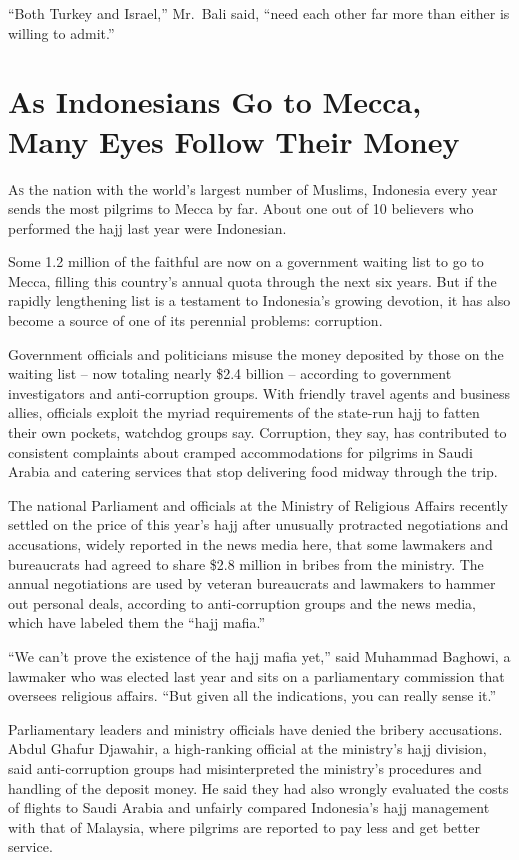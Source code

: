 ﻿\documentclass[12pt]{article}
\begin{document}
``Both Turkey and Israel,'' Mr.~Bali said, ``need each other far more than either is willing to
admit.''

\section{As Indonesians Go to Mecca, Many Eyes Follow Their Money}

\lettrine{A}{s} the nation with the world's largest number of Muslims,
Indonesia every year sends the most pilgrims to Mecca by far. About one out of 10 believers who
performed the hajj last year were Indonesian.

Some 1.2 million of the faithful are now on a government waiting list to go to Mecca, filling this
country's annual quota through the next six years. But if the rapidly lengthening list is a
testament to Indonesia's growing devotion, it has also become a source of one of its perennial
problems: corruption.

Government officials and politicians misuse the money deposited by those on the waiting list -- now
totaling nearly \$2.4 billion -- according to government investigators and anti-corruption groups.
With friendly travel agents and business allies, officials exploit the myriad requirements of the
state-run hajj to fatten their own pockets, watchdog groups say. Corruption, they say, has
contributed to consistent complaints about cramped accommodations for pilgrims in Saudi Arabia and
catering services that stop delivering food midway through the trip.

The national Parliament and officials at the Ministry of Religious Affairs recently settled on the
price of this year's hajj after unusually protracted negotiations and accusations, widely reported
in the news media here, that some lawmakers and bureaucrats had agreed to share \$2.8 million in
bribes from the ministry. The annual negotiations are used by veteran bureaucrats and lawmakers to
hammer out personal deals, according to anti-corruption groups and the news media, which have
labeled them the ``hajj mafia.''

``We can't prove the existence of the hajj mafia yet,'' said Muhammad Baghowi, a lawmaker who was
elected last year and sits on a parliamentary commission that oversees religious affairs. ``But
given all the indications, you can really sense it.''

Parliamentary leaders and ministry officials have denied the bribery accusations. Abdul Ghafur
Djawahir, a high-ranking official at the ministry's hajj division, said anti-corruption groups had
misinterpreted the ministry's procedures and handling of the deposit money. He said they had also
wrongly evaluated the costs of flights to Saudi Arabia and unfairly compared Indonesia's hajj
management with that of Malaysia, where pilgrims are reported to pay less and get better service.
\end{document}
